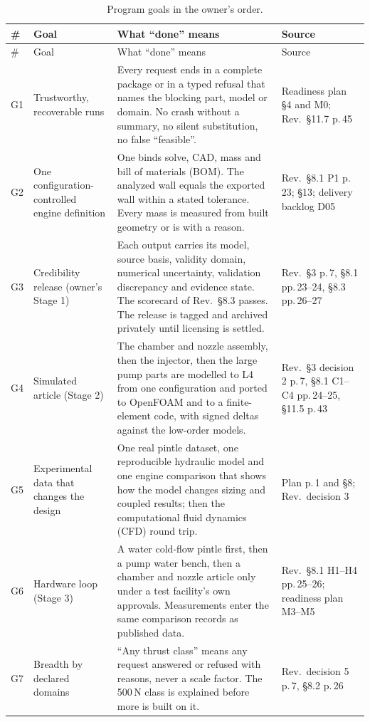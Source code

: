 {\rwsmall
\begin{longtable}{@{}P{0.6cm}P{3.0cm}P{8.0cm}P{4.3cm}@{}}
\caption{Program goals in the owner's order.}\label{tab:rw-goals}\\
\toprule
\# & Goal & What ``done'' means & Source \\
\midrule
\endfirsthead
\toprule
\# & Goal & What ``done'' means & Source \\
\midrule
\endhead
G1 & Trustworthy, recoverable runs & Every request ends in a complete package or in a typed refusal that names the blocking part, model or domain. No crash without a summary, no silent substitution, no false ``feasible''. & Readiness plan \S4 and M0; Rev.\ \S11.7 p.\,45 \\
G2 & One configuration-controlled engine definition & One  binds solve, CAD, mass and bill of materials (BOM). The analyzed wall equals the exported wall within a stated tolerance. Every mass is measured from built geometry or is  with a reason. & Rev.\ \S8.1 P1 p.\,23;  \S13; delivery backlog D05 \\
G3 & Credibility release (owner's Stage 1) & Each output carries its model, source basis, validity domain, numerical uncertainty, validation discrepancy and evidence state. The scorecard of Rev.\ \S8.3 passes. The release is tagged and archived privately until licensing is settled. & Rev.\ \S3 p.\,7, \S8.1 pp.\,23--24, \S8.3 pp.\,26--27 \\
G4 & Simulated article (Stage 2) & The chamber and nozzle assembly, then the injector, then the large pump parts are modelled to L4 from one configuration and ported to OpenFOAM and to a finite-element code, with signed deltas against the low-order models. & Rev.\ \S3 decision 2 p.\,7, \S8.1 C1--C4 pp.\,24--25, \S11.5 p.\,43 \\
G5 & Experimental data that changes the design & One real pintle dataset, one reproducible hydraulic model and one engine comparison that shows how the model changes sizing and coupled results; then the computational fluid dynamics (CFD) round trip. & Plan p.\,1 and \S8; Rev.\ decision 3 \\
G6 & Hardware loop (Stage 3) & A water cold-flow pintle first, then a pump water bench, then a chamber and nozzle article only under a test facility's own approvals. Measurements enter the same comparison records as published data. & Rev.\ \S8.1 H1--H4 pp.\,25--26; readiness plan M3--M5 \\
G7 & Breadth by declared domains & ``Any thrust class'' means any request answered or refused with reasons, never a scale factor. The 500\,N class is explained before more is built on it. & Rev.\ decision 5 p.\,7, \S8.2 p.\,26 \\

\end{longtable}}
